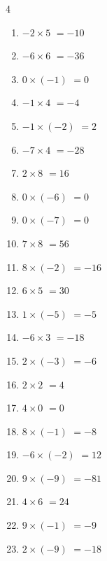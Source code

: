\begin{multicols}{4}
\begin{enumerate}
  \item $-2\times 5$
        $=-10$

  \item $-6\times 6$
        $=-36$

  \item $0\times (-1)$
        $=0$

  \item $-1\times 4$
        $=-4$

  \item $-1\times (-2)$
        $=2$

  \item $-7\times 4$
        $=-28$

  \item $2\times 8$
        $=16$

  \item $0\times (-6)$
        $=0$

  \item $0\times (-7)$
        $=0$

  \item $7\times 8$
        $=56$

  \item $8\times (-2)$
        $=-16$

  \item $6\times 5$
        $=30$

  \item $1\times (-5)$
        $=-5$

  \item $-6\times 3$
        $=-18$

  \item $2\times (-3)$
        $=-6$

  \item $2\times 2$
        $=4$

  \item $4\times 0$
        $=0$

  \item $8\times (-1)$
        $=-8$

  \item $-6\times (-2)$
        $=12$

  \item $9\times (-9)$
        $=-81$

  \item $4\times 6$
        $=24$

  \item $9\times (-1)$
        $=-9$

  \item $2\times (-9)$
        $=-18$


\end{enumerate}
\end{multicols}
